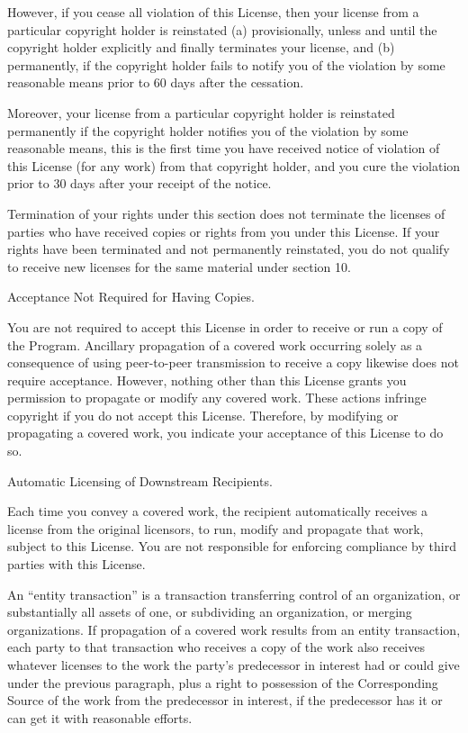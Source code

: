 However, if you cease all violation of this License, then your license from a particular copyright holder is reinstated (a) provisionally, unless and until the copyright holder explicitly and finally terminates your license, and (b) permanently, if the copyright holder fails to notify you of the violation by some reasonable means prior to 60 days after the cessation.

Moreover, your license from a particular copyright holder is reinstated permanently if the copyright holder notifies you of the violation by some reasonable means, this is the first time you have received notice of violation of this License (for any work) from that copyright holder, and you cure the violation prior to 30 days after your receipt of the notice.

Termination of your rights under this section does not terminate the licenses of parties who have received copies or rights from you under this License.  If your rights have been terminated and not permanently reinstated, you do not qualify to receive new licenses for the same material under section 10.

\item Acceptance Not Required for Having Copies.

You are not required to accept this License in order to receive or run a copy of the Program.  Ancillary propagation of a covered work occurring solely as a consequence of using peer-to-peer transmission to receive a copy likewise does not require acceptance.  However, nothing other than this License grants you permission to propagate or modify any covered work.  These actions infringe copyright if you do not accept this License.  Therefore, by modifying or propagating a covered work, you indicate your acceptance of this License to do so.

\item Automatic Licensing of Downstream Recipients.

Each time you convey a covered work, the recipient automatically receives a license from the original licensors, to run, modify and propagate that work, subject to this License.  You are not responsible for enforcing compliance by third parties with this License.

An ``entity transaction'' is a transaction transferring control of an organization, or substantially all assets of one, or subdividing an organization, or merging organizations.  If propagation of a covered work results from an entity transaction, each party to that transaction who receives a copy of the work also receives whatever licenses to the work the party's predecessor in interest had or could give under the previous paragraph, plus a right to possession of the Corresponding Source of the work from the predecessor in interest, if the predecessor has it or can get it with reasonable efforts.

